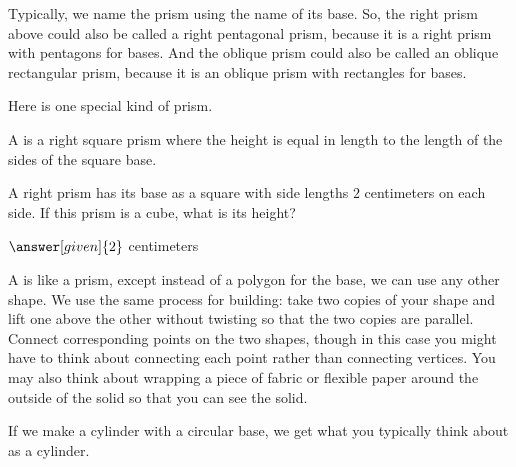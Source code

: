 \documentclass{ximera}
\begin{document}
\begin{definition}
\begin{image}
\end{image}
\end{definition}

Typically, we name the prism using the name of its base. So, the right prism above could also be called a right pentagonal prism, because it is a right prism with pentagons for bases. And the oblique prism could also be called an oblique rectangular prism, because it is an oblique prism with rectangles for bases.

Here is one special kind of prism.
\begin{definition}
A  is a right square prism where the height is equal in length to the length of the sides of the square base.
\end{definition}

\begin{question}
	A right prism has its base as a square with side lengths $2$ centimeters on each side. If this prism is a cube, what is its height?
	\begin{prompt}
		$\answer[given]{2}$ centimeters
	\end{prompt}
\end{question}


A  is like a prism, except instead of a polygon for the base, we can use any other shape. We use the same process for building: take two copies of your shape and lift one above the other without twisting so that the two copies are parallel. Connect corresponding points on the two shapes, though in this case you might have to think about connecting each point rather than connecting vertices. You may also think about wrapping a piece of fabric or flexible paper around the outside of the solid so that you can see the solid.

If we make a cylinder with a circular base, we get what you typically think about as a cylinder.
\begin{image}
\end{image}
\end{document}
